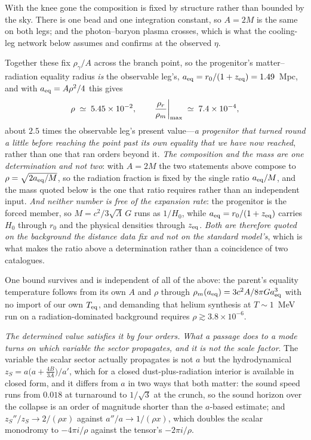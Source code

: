 \documentclass[11pt,a4paper]{article}
\theoremstyle{plain}
\theoremstyle{definition}
\theoremstyle{remark}
\begin{document}
With the knee gone the composition is fixed by structure rather than bounded by the sky. There is one bead and one integration constant, so $A=2M$ is the same on both legs; and the photon--baryon plasma crosses, which is what the cooling-leg network below assumes and confirms at the observed $\eta$. 

Together these fix $\rho_\gamma/A$ across the branch point, so the progenitor's matter--radiation equality radius \emph{is} the observable leg's, $a_{\rm eq}=r_0/(1+z_{\rm eq})=1.49$~Mpc, and with $a_{\rm eq}=A\rho^2/4$ this gives
\[
\rho\;\simeq\;5.45\times10^{-2},\qquad \left.\frac{\rho_r}{\rho_m}\right|_{\rm max}\;\simeq\;7.4\times10^{-4},
\]
about $2.5$ times the observable leg's present value---\emph{a progenitor that turned round a little before reaching the point past its own equality that we have now reached}, rather than one that ran orders beyond it. \emph{The composition and the mass are one determination and not two}: with $A=2M$ the two statements above compose to $\rho=\sqrt{2a_{\rm eq}/M}$, so the radiation fraction is fixed by the single ratio $a_{\rm eq}/M$, and the mass quoted below is the one that ratio requires rather than an independent input. \emph{And neither number is free of the expansion rate}: the progenitor is the forced member, so $M=c^{2}/3\sqrt\Lambda\,G$ runs as $1/H_0$, while $a_{\rm eq}=r_0/(1+z_{\rm eq})$ carries $H_0$ through $r_0$ and the physical densities through $z_{\rm eq}$. \emph{Both are therefore quoted on the background the distance data fix and not on the standard model's}, which is what makes the ratio above a determination rather than a coincidence of two catalogues. 

One bound survives and is independent of all of the above: the parent's equality temperature follows from its own $A$ and $\rho$ through $\rho_m(a_{\rm eq})=3c^2A/8\pi Ga_{\rm eq}^3$ with no import of our own $T_{\rm eq}$, and demanding that helium synthesis at $T\sim1$~MeV run on a radiation-dominated background requires $\rho\gtrsim3.8\times10^{-6}$. 

\emph{The determined value satisfies it by four orders.} \emph{What a passage does to a mode turns on which variable the sector propagates, and it is not the scale factor}. The variable the scalar sector actually propagates is not $a$ but the hydrodynamical $z_S=a\bigl(a+\tfrac{4B}{3A}\bigr)/a'$, which for a closed dust-plus-radiation interior is available in closed form, and it differs from $a$ in two ways that both matter: the sound speed runs from $0.018$ at turnaround to $1/\sqrt3$ at the crunch, so the sound horizon over the collapse is an order of magnitude shorter than the $a$-based estimate; and $z_S''/z_S\to2/(\rho x)$ against $a''/a\to1/(\rho x)$, which doubles the scalar monodromy to $-4\pi i/\rho$ against the tensor's $-2\pi i/\rho$. 
\end{document}
